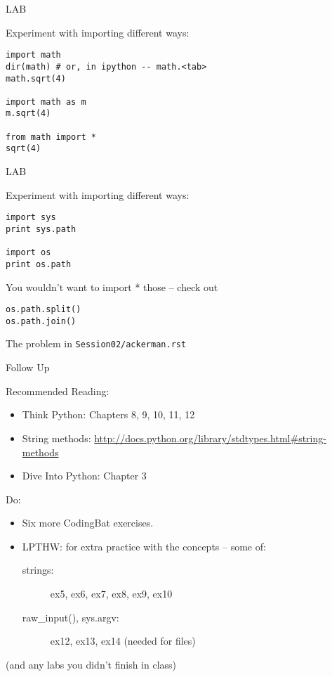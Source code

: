 \documentclass{beamer}
\begin{document}
\begin{frame}[fragile]{LAB}

{\Large  Experiment with importing different ways:}
\begin{verbatim}
import math
dir(math) # or, in ipython -- math.<tab>
math.sqrt(4)

import math as m
m.sqrt(4)

from math import *
sqrt(4)
\end{verbatim}

\end{frame}

\begin{frame}[fragile]{LAB}

{\Large  Experiment with importing different ways:}
\begin{verbatim}
import sys
print sys.path

import os
print os.path
\end{verbatim}
{\Large You wouldn't want to import * those -- check out}
\begin{verbatim}
os.path.split()
os.path.join()
\end{verbatim}

\vfill
The problem in \verb|Session02/ackerman.rst| 

\end{frame}

\begin{frame}[fragile]{Follow Up}

Recommended Reading:
\begin{itemize}
  \item Think Python: Chapters 8, 9, 10, 11, 12
  \item String methods: \url{http://docs.python.org/library/stdtypes.html#string-methods}
  \item Dive Into Python: Chapter 3
\end{itemize}

Do:
\begin{itemize}
    \item Six more CodingBat exercises.
    \item LPTHW: for extra practice with the concepts -- some of:
    \begin{description}
        \item[strings:] ex5, ex6, ex7, ex8, ex9, ex10
        \item[raw\_input(), sys.argv:] ex12, ex13, ex14 (needed for files)
    \end{description}    
\end{itemize}

\vfill
(and any labs you didn't finish in class)

\end{frame}
\end{document}
